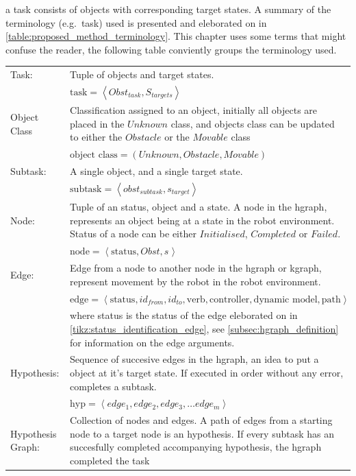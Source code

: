 a task consists of objects with corresponding target states. A summary of the terminology (e.g.~task) used is presented and eleborated on in \cref{table:proposed_method_terminology}.
This chapter uses some terms that might confuse the reader, the following table conviently groups the terminology used.
\begin{table}[ht]
\centering
\begin{tabular}[t]{l p{10cm}}
Task:   & Tuple of objects and target states.\\
        & $\text{task} = \left\langle Obst_{task}, S_{targets} \right\rangle$\\
Object Class & Classification assigned to an object, initially all objects are placed in the $Unknown$ class, and objects class can be updated to either the $Obstacle$ or the $Movable$ class\\
        & $\text{object class} = (Unknown, Obstacle, Movable)$\\
Subtask:& A single object, and a single target state.\\
        & $\text{subtask} = \left\langle obst_{subtask}, s_{target} \right\rangle$\\
Node:   & Tuple of an status, object and a state. A node in the \acs{hgraph}, represents an object being at a state in the robot environment. Status of a node can be either $Initialised$, $Completed$ or $Failed$.\\
        & $\text{node} = \left\langle \textrm{status}, Obst, s_{} \right\rangle$\\
Edge:   & Edge from a node to another node in the \acs{hgraph} or \ac{kgraph}, represent movement by the robot in the robot environment.\\
        & $ \text{edge} = \left\langle \textrm{status}, id_{from}, id_{to}, \textrm{verb}, \textrm{controller},\textrm{dynamic model}, \textrm{path}\right\rangle$\\
        & where status is the status of the edge eleborated on in \cref{tikz:status_identification_edge}, see \cref{subsec:hgraph_definition} for information on the edge arguments.\\
Hypothesis:& Sequence of succesive edges in the \ac{hgraph}, an idea to put a object at it's target state. If executed in order without any error, completes a subtask.\\
        & $ \text{hyp} = \left\langle edge_{1}, edge_{2}, edge_{3}, \dots edge_{m} \right\rangle $\\
Hypothesis Graph:& Collection of nodes and edges. A path of edges from a starting node to a target node is an hypothesis. If every subtask has an succesfully completed accompanying hypothesis, the \ac{hgraph} completed the task\\

\end{tabular}
\end{table}

